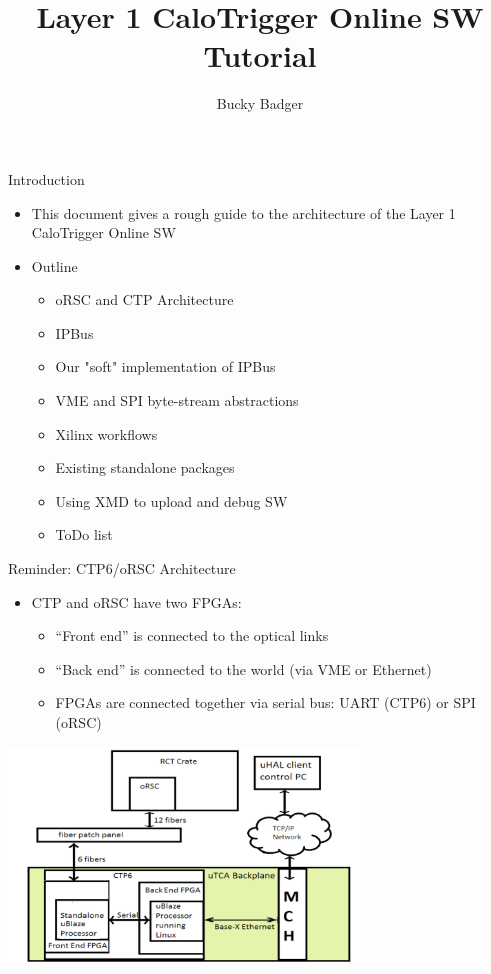 \documentclass{beamer}
\title[UW Layer-1 SW Tutorial]{Layer 1 CaloTrigger Online SW Tutorial}
\author{Bucky Badger}
\institute{UW Madison}
\begin{document}
\begin{frame}
\titlepage
\end{frame}

\begin{frame}{Introduction}
\begin{itemize}
\item This document gives a rough guide to the architecture of the Layer 1 CaloTrigger Online SW
\item Outline
\begin{itemize}
\item oRSC and CTP Architecture
\item IPBus
\item Our "soft" implementation of IPBus
\item VME and SPI byte-stream abstractions
\item Xilinx workflows
\item Existing standalone packages
\item Using XMD to upload and debug SW
\item ToDo list
\end{itemize}
\end{itemize}
\end{frame}

\begin{frame}{Reminder: CTP6/oRSC Architecture}
\begin{itemize}
\item CTP and oRSC have two FPGAs:
\begin{itemize}
\item ``Front end'' is connected to the optical links 
\item ``Back end'' is connected to the world (via VME or Ethernet)
\item FPGAs are connected together via serial bus: UART (CTP6) or SPI (oRSC)
\end{itemize}
\end{itemize}
\begin{center}
\includegraphics[width=0.7\textwidth]{images/orsc_ctp_ipbus_interface.pdf}
\end{center}
\end{frame}
\end{document}
